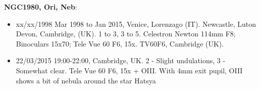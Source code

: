 {\bf NGC1980, Ori, Neb}:
\begin{itemize}
\item xx/xx/1998 Mar 1998 to Jan 2015, Venice, Lorenzago (IT). Newcastle, Luton Devon, Cambridge, (UK). 1 to 3, 3 to 5. Celestron Newton 114mm F8; Binoculars 15x70; Tele Vue 60 F6, 15x. TV60F6, Cambridge (UK).
\item 22/03/2015 19:00-22:00, Cambridge, UK. 2 - Slight undulations, 3 - Somewhat clear. Tele Vue 60 F6, 15x + OIII. With 4mm exit pupil, OIII shows a bit of nebula around the star Hatsya
\end{itemize}
